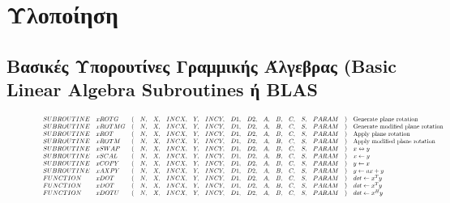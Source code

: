 \chapter{Υλοποίηση}
\label{chapter:implementation}

\section{Βασικές Υπορουτίνες Γραμμικής Άλγεβρας (Basic Linear Algebra Subroutines ή BLAS}

\cite{lapack99}

\begin{figure}
    \centering
\[
\scalemath{0.6}{
\begin{array}{lllllllllllllllll}
SUBROUTINE & xROTG  & ( & N, & X, & INCX, & Y, & INCY, & D1, & D2, & A, & B, & C, & S, & PARAM & ) & \text{Generate plane rotation}\\
SUBROUTINE & xROTMG & ( & N, & X, & INCX, & Y, & INCY, & D1, & D2, & A, & B, & C, & S, & PARAM & ) & \text{Generate modified plane rotation}\\
SUBROUTINE & xROT   & ( & N, & X, & INCX, & Y, & INCY, & D1, & D2, & A, & B, & C, & S, & PARAM & ) & \text{Apply plane rotation}\\
SUBROUTINE & xROTM  & ( & N, & X, & INCX, & Y, & INCY, & D1, & D2, & A, & B, & C, & S, & PARAM & ) & \text{Apply modified plane rotation}\\
SUBROUTINE & xSWAP  & ( & N, & X, & INCX, & Y, & INCY, & D1, & D2, & A, & B, & C, & S, & PARAM & ) & x \leftrightarrow y\\
SUBROUTINE & xSCAL  & ( & N, & X, & INCX, & Y, & INCY, & D1, & D2, & A, & B, & C, & S, & PARAM & ) & x \leftarrow y\\
SUBROUTINE & xCOPY  & ( & N, & X, & INCX, & Y, & INCY, & D1, & D2, & A, & B, & C, & S, & PARAM & ) & y \leftarrow x\\
SUBROUTINE & xAXPY  & ( & N, & X, & INCX, & Y, & INCY, & D1, & D2, & A, & B, & C, & S, & PARAM & ) & y \leftarrow ax + y\\
FUNCTION   & xDOT   & ( & N, & X, & INCX, & Y, & INCY, & D1, & D2, & A, & B, & C, & S, & PARAM & ) & dot \leftarrow x^Ty\\
FUNCTION   & xDOT   & ( & N, & X, & INCX, & Y, & INCY, & D1, & D2, & A, & B, & C, & S, & PARAM & ) & dot \leftarrow x^Ty\\
FUNCTION   & xDOTU  & ( & N, & X, & INCX, & Y, & INCY, & D1, & D2, & A, & B, & C, & S, & PARAM & ) & dot \leftarrow x^Hy\\

\end{array}}\]
\end{figure}
